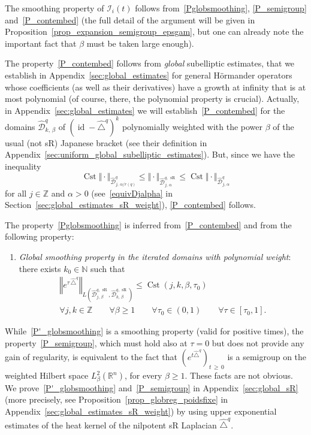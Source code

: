 \documentclass[10pt]{amsart}
\theoremstyle{definition}\newtheorem{defi}[theo]{Definition}\newtheorem{rema}[theo]{Remark}\newtheorem{exam}[theo]{Example}\newtheorem{exem}[theo]{Example}\newtheorem{nota}[theo]{Notation}
\newcommand*\R{\mathbb{R}}
\newcommand*\N{\mathbb{N}}
\newcommand*\Z{\mathbb{Z}}
\newcommand{\calI}{\mathcal{I}}
\newcommand{\calD}{\mathcal{D}}
\DeclareMathOperator{\Cst}{Cst}
\DeclareMathOperator{\id}{id}
\DeclareMathOperator{\sR}{sR}
\renewcommand{\geq}{\geqslant}
\renewcommand{\leq}{\leqslant}
\newcommand*{\Peenumi}{\renewcommand*{\theenumi}{$\mathbf{P'}_\arabic{enumi}$}}
\let\oldforall\forall
\renewcommand*{\forall}{\mathrel{\oldforall}}
\begin{document}
The smoothing property of $\calI_i(t)$ follows from~\eqref{Pglobsmoothing}, \eqref{P_semigroup} and~\eqref{P_contembed} (the full detail of the argument will be given in Proposition~\eqref{prop_expansion_semigroup_epsgam}, but one can already note the important fact that $\beta$ must be taken large enough).

The property~\eqref{P_contembed} follows from \emph{global} subelliptic estimates, that we establish in Appendix~\ref{sec:global_estimates} for general H\"ormander operators whose coefficients (as well as their derivatives) have a growth at infinity that is at most polynomial (of course, there, the polynomial property is crucial). Actually, in Appendix~\ref{sec:global_estimates} we will establish~\eqref{P_contembed} for the domains $\widehat{\calD}^{q}_{k,\,\beta}$ of $(\id - \widehat{\triangle}^{q})^k$ polynomially weighted with the power $\beta$ of the usual (not sR) Japanese bracket (see their definition in Appendix~\ref{sec:uniform_global_subelliptic_estimates}). But, since we have the inequality
\[
\Cst \Vert \cdot\Vert_{\widehat{\calD}^q_{j,\,\alpha/r(q)}} \leq \Vert \cdot\Vert_{\widehat{\calD}_{j,\,\alpha}^{q,\,\sR}} \leq \Cst \Vert \cdot\Vert_{\widehat{\calD}^q_{j,\,\alpha}}
\]
for all $j\in\Z$ and $\alpha>0$ (see~\eqref{equivDjalpha} in Section~\ref{sec:global_estimates_sR_weight}), \eqref{P_contembed} follows.

The property~\eqref{Pglobsmoothing} is inferred from~\eqref{P_contembed} and from the following property:
\begin{enumerate}\Peenumi
\item\label{P'_globsmoothing}
\emph{Global smoothing property in the iterated domains with polynomial weight}: there exists $k_0\in\N$ such that
\begin{multline*}
\left\Vert e^{\tau\,\widehat{\triangle}^{q}}\right\Vert_{L\left(\widehat{\calD}^{q,\,\sR}_{j,\,\beta}, \widehat{\calD}^{q,\,\sR}_{k,\,\beta}\right)} \leq \Cst(j,k,\beta,\tau_0) \\
\forall j,k\in\Z\qquad \forall\beta\geq 1 \qquad \forall \tau_0\in(0,1) \qquad \forall \tau\in[\tau_0,1].
\end{multline*}
\end{enumerate}
While~\eqref{P'_globsmoothing} is a smoothing property (valid for positive times), the property~\eqref{P_semigroup}, which must hold also at $\tau=0$ but does not provide any gain of regularity, is equivalent to the fact that $(e^{t\widehat{\triangle}^{q}})_{t\,\geq\,0}$ is a semigroup on the weighted Hilbert space $L^2_\beta(\R^n)$, for every $\beta\geq 1$. These facts are not obvious. We prove~\eqref{P'_globsmoothing} and~\eqref{P_semigroup} in Appendix~\ref{sec:global_sR} (more precisely, see Proposition~\ref{prop_globreg_poidsfixe} in Appendix~\ref{sec:global_estimates_sR_weight}) by using upper exponential estimates of the heat kernel of the nilpotent sR Laplacian $\widehat{\triangle}^{q}$.
\end{document}
